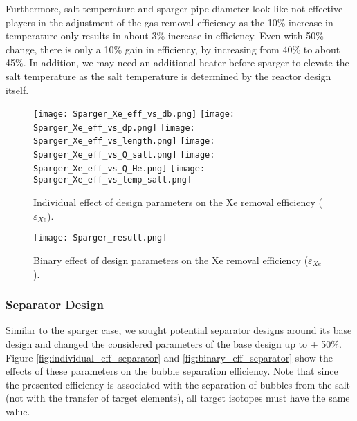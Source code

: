     Furthermore, salt temperature and sparger pipe diameter look like not 
    effective players in the adjustment of the gas removal efficiency as the 
    10\% increase in temperature only results in about 3\% increase in 
    efficiency. Even with 50\% change, there is only a 10\% gain in efficiency, 
    by increasing from 40\% to about 45\%. In addition, we may need an 
    additional heater before sparger to elevate the salt temperature as the 
    salt temperature is determined by the reactor design itself.

    \begin{figure}[htbp!]
        \begin{center}
            \texttt{[image: Sparger\_Xe\_eff\_vs\_db.png]}
            \texttt{[image: Sparger\_Xe\_eff\_vs\_dp.png]}
            \texttt{[image: Sparger\_Xe\_eff\_vs\_length.png]}
            \texttt{[image: Sparger\_Xe\_eff\_vs\_Q\_salt.png]}
            \texttt{[image: Sparger\_Xe\_eff\_vs\_Q\_He.png]}
            \texttt{[image: Sparger\_Xe\_eff\_vs\_temp\_salt.png]}
        \end{center}
        \caption{Individual effect of design parameters on the Xe removal 
            efficiency ($\varepsilon$$_{Xe}$).}
        \label{fig:individual_eff_sparger}
    \end{figure}

    \begin{figure}[htbp!]
        \begin{center}
            \texttt{[image: Sparger\_result.png]}
        \end{center}
        \caption{Binary effect of design parameters on the Xe removal 
            efficiency ($\varepsilon$$_{Xe}$).}
        \label{fig:binary_eff_sparger}
    \end{figure}

\FloatBarrier

\subsubsection{Separator Design}

    Similar to the sparger case, we sought potential separator designs around 
    its base design and changed the considered parameters of the base design up 
    to $\pm$ 50\%. Figure \ref{fig:individual_eff_separator} and 
    \ref{fig:binary_eff_separator} show the effects of these parameters on the 
    bubble separation efficiency. Note that since the presented efficiency is 
    associated with the separation of bubbles from the salt (not with the 
    transfer of target elements), all target isotopes must have the same value.

